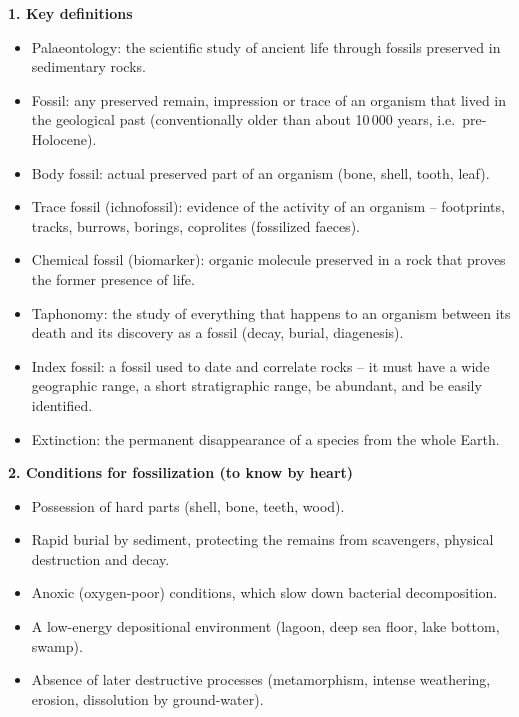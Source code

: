 \documentclass[11pt]{article}
\newcommand{\cle}[1]{{\popxbold\color{popdark}#1}}
\begin{document}
\begin{aretenir}
\textbf{1. Key definitions}
\begin{itemize}
\item \cle{Palaeontology}: the scientific study of ancient life through fossils preserved in sedimentary rocks.
\item \cle{Fossil}: any preserved remain, impression or trace of an organism that lived in the geological past (conventionally older than about 10\,000 years, i.e.\ pre-Holocene).
\item \cle{Body fossil}: actual preserved part of an organism (bone, shell, tooth, leaf).
\item \cle{Trace fossil} (ichnofossil): evidence of the activity of an organism -- footprints, tracks, burrows, borings, coprolites (fossilized faeces).
\item \cle{Chemical fossil} (biomarker): organic molecule preserved in a rock that proves the former presence of life.
\item \cle{Taphonomy}: the study of everything that happens to an organism between its death and its discovery as a fossil (decay, burial, diagenesis).
\item \cle{Index fossil}: a fossil used to date and correlate rocks -- it must have a wide geographic range, a short stratigraphic range, be abundant, and be easily identified.
\item \cle{Extinction}: the permanent disappearance of a species from the whole Earth.
\end{itemize}

\textbf{2. Conditions for fossilization (to know by heart)}
\begin{itemize}
\item Possession of \cle{hard parts} (shell, bone, teeth, wood).
\item \cle{Rapid burial} by sediment, protecting the remains from scavengers, physical destruction and decay.
\item \cle{Anoxic (oxygen-poor) conditions}, which slow down bacterial decomposition.
\item A low-energy depositional environment (lagoon, deep sea floor, lake bottom, swamp).
\item Absence of later destructive processes (metamorphism, intense weathering, erosion, dissolution by ground-water).
\end{itemize}


\end{aretenir}
\end{document}
